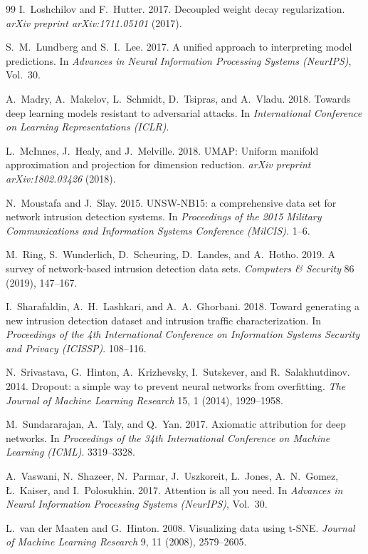 \documentclass[sigconf]{acmart}
\begin{document}
\begin{thebibliography}{99}
I.\ Loshchilov and F.\ Hutter. 2017. Decoupled weight decay regularization. \textit{arXiv preprint arXiv:1711.05101} (2017).

S.\ M.\ Lundberg and S.\ I.\ Lee. 2017. A unified approach to interpreting model predictions. In \textit{Advances in Neural Information Processing Systems (NeurIPS)}, Vol.\ 30.

A.\ Madry, A.\ Makelov, L.\ Schmidt, D.\ Tsipras, and A.\ Vladu. 2018. Towards deep learning models resistant to adversarial attacks. In \textit{International Conference on Learning Representations (ICLR)}.

L.\ McInnes, J.\ Healy, and J.\ Melville. 2018. UMAP: Uniform manifold approximation and projection for dimension reduction. \textit{arXiv preprint arXiv:1802.03426} (2018).

N.\ Moustafa and J.\ Slay. 2015. UNSW-NB15: a comprehensive data set for network intrusion detection systems. In \textit{Proceedings of the 2015 Military Communications and Information Systems Conference (MilCIS)}. 1--6.

M.\ Ring, S.\ Wunderlich, D.\ Scheuring, D.\ Landes, and A.\ Hotho. 2019. A survey of network-based intrusion detection data sets. \textit{Computers \& Security} 86 (2019), 147--167.

I.\ Sharafaldin, A.\ H.\ Lashkari, and A.\ A.\ Ghorbani. 2018. Toward generating a new intrusion detection dataset and intrusion traffic characterization. In \textit{Proceedings of the 4th International Conference on Information Systems Security and Privacy (ICISSP)}. 108--116.

N.\ Srivastava, G.\ Hinton, A.\ Krizhevsky, I.\ Sutskever, and R.\ Salakhutdinov. 2014. Dropout: a simple way to prevent neural networks from overfitting. \textit{The Journal of Machine Learning Research} 15, 1 (2014), 1929--1958.

M.\ Sundararajan, A.\ Taly, and Q.\ Yan. 2017. Axiomatic attribution for deep networks. In \textit{Proceedings of the 34th International Conference on Machine Learning (ICML)}. 3319--3328.

A.\ Vaswani, N.\ Shazeer, N.\ Parmar, J.\ Uszkoreit, L.\ Jones, A.\ N.\ Gomez, {\L}.\ Kaiser, and I.\ Polosukhin. 2017. Attention is all you need. In \textit{Advances in Neural Information Processing Systems (NeurIPS)}, Vol.\ 30.

L.\ van der Maaten and G.\ Hinton. 2008. Visualizing data using t-SNE. \textit{Journal of Machine Learning Research} 9, 11 (2008), 2579--2605.


\end{thebibliography}
\end{document}
